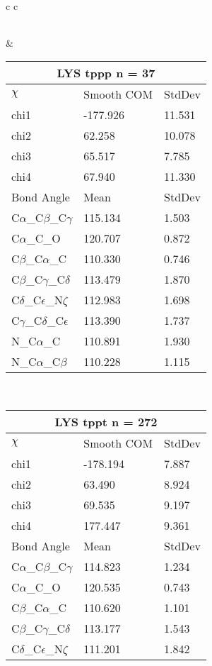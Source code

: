 \begin{longtable}{ c c }
\begin{tabular}{ l l l }
  \bottomrule
  \end{tabular}
  &
  \begin{tabular}{ l l l }
  \toprule
  \multicolumn{3}{c}{LYS \textbf{tppp} n = 37} \\ \toprule
  $\chi$       & Smooth COM & StdDev \\ \midrule
  chi1 & -177.926 & 11.531 \\ 
  chi2 & 62.258 & 10.078 \\ 
  chi3 & 65.517 & 7.785 \\ 
  chi4 & 67.940 & 11.330 \\ \midrule
  Bond Angle   & Mean     & StdDev \\ \midrule
  C$\alpha$\_C$\beta$\_C$\gamma$ & 115.134 & 1.503\\
  C$\alpha$\_C\_O & 120.707 & 0.872\\
  C$\beta$\_C$\alpha$\_C & 110.330 & 0.746\\
  C$\beta$\_C$\gamma$\_C$\delta$ & 113.479 & 1.870\\
  C$\delta$\_C$\epsilon$\_N$\zeta$ & 112.983 & 1.698\\
  C$\gamma$\_C$\delta$\_C$\epsilon$ & 113.390 & 1.737\\
  N\_C$\alpha$\_C & 110.891 & 1.930\\
  N\_C$\alpha$\_C$\beta$ & 110.228 & 1.115\\
  \bottomrule
  \end{tabular}
  \\
  \begin{tabular}{ l l l }
  \toprule
  \multicolumn{3}{c}{LYS \textbf{tppt} n = 272} \\ \toprule
  $\chi$       & Smooth COM & StdDev \\ \midrule
  chi1 & -178.194 & 7.887 \\ 
  chi2 & 63.490 & 8.924 \\ 
  chi3 & 69.535 & 9.197 \\ 
  chi4 & 177.447 & 9.361 \\ \midrule
  Bond Angle   & Mean     & StdDev \\ \midrule
  C$\alpha$\_C$\beta$\_C$\gamma$ & 114.823 & 1.234\\
  C$\alpha$\_C\_O & 120.535 & 0.743\\
  C$\beta$\_C$\alpha$\_C & 110.620 & 1.101\\
  C$\beta$\_C$\gamma$\_C$\delta$ & 113.177 & 1.543\\
  C$\delta$\_C$\epsilon$\_N$\zeta$ & 111.201 & 1.842\\

\end{tabular}
\end{longtable}
